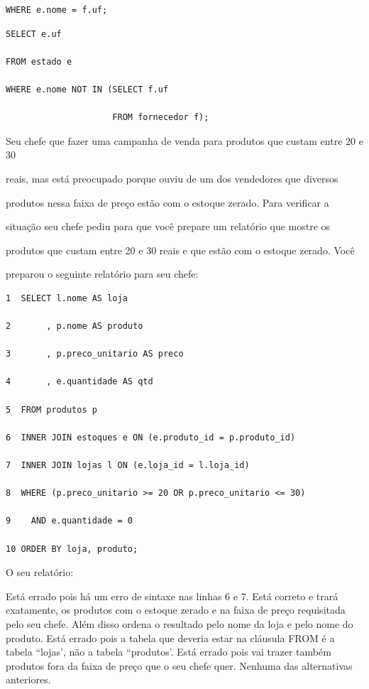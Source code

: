 \documentclass[12pt, addpoints]{exam}
\begin{document}
\begin{questions}
\begin{choices}
\begin{verbatim}
WHERE e.nome = f.uf;

\end{verbatim}


\choice \begin{verbatim}SELECT e.uf

FROM estado e

WHERE e.nome NOT IN (SELECT f.uf

                     FROM fornecedor f);

\end{verbatim}
\end{choices}

\question

Seu chefe que fazer uma campanha de venda para produtos que custam entre 20 e 30

reais, mas está preocupado porque ouviu de um dos vendedores que diversos

produtos nessa faixa de preço estão com o estoque zerado. Para verificar a

situação seu chefe pediu para que você prepare um relatório que mostre os

produtos que custam entre 20 e 30 reais e que estão com o estoque zerado. Você

preparou o seguinte relatório para seu chefe:

\begin{tcolorbox}

 \begin{verbatim}1  SELECT l.nome AS loja

2       , p.nome AS produto

3       , p.preco_unitario AS preco

4       , e.quantidade AS qtd

5  FROM produtos p

6  INNER JOIN estoques e ON (e.produto_id = p.produto_id)

7  INNER JOIN lojas l ON (e.loja_id = l.loja_id)

8  WHERE (p.preco_unitario >= 20 OR p.preco_unitario <= 30)

9    AND e.quantidade = 0

10 ORDER BY loja, produto;

 \end{verbatim}

\end{tcolorbox}

O seu relatório:
\begin{choices}
\choice Está errado pois há um erro de sintaxe nas linhas 6 e 7.
\choice Está correto e trará exatamente, os produtos com o estoque zerado e na faixa de preço requisitada pelo seu chefe. Além disso ordena o resultado pelo nome da loja e pelo nome do produto.
\choice Está errado pois a tabela que deveria estar na cláusula FROM é a tabela ``lojas', não a tabela ``produtos'.
\choice Está errado pois vai trazer também produtos fora da faixa de preço que o seu chefe quer.
\choice Nenhuma das alternativas anteriores.
\end{choices}


\end{questions}
\end{document}
